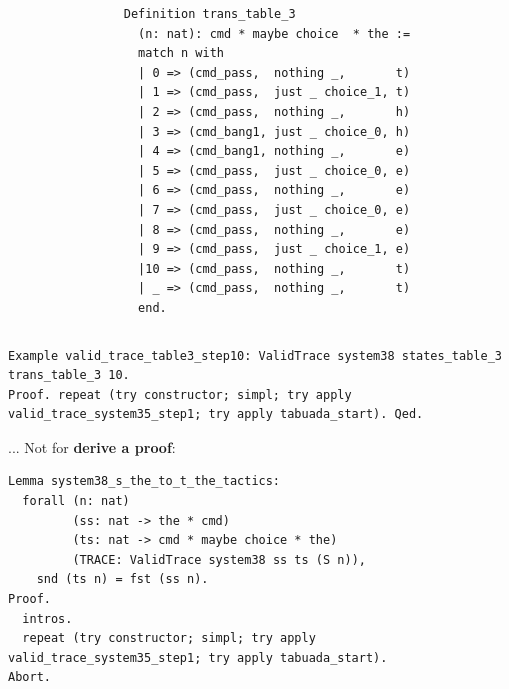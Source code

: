 \documentclass{beamer}
\begin{document}
\begin{frame}[fragile]
\begin{columns}[T]
\begin{column}{.3\textwidth}
\end{column}
\begin{column}{.4\textwidth}
{\fontsize{2.5}{4}\selectfont
\begin{verbatim}
Definition trans_table_3
  (n: nat): cmd * maybe choice  * the :=
  match n with
  | 0 => (cmd_pass,  nothing _,       t)
  | 1 => (cmd_pass,  just _ choice_1, t) 
  | 2 => (cmd_pass,  nothing _,       h) 
  | 3 => (cmd_bang1, just _ choice_0, h) 
  | 4 => (cmd_bang1, nothing _,       e) 
  | 5 => (cmd_pass,  just _ choice_0, e) 
  | 6 => (cmd_pass,  nothing _,       e) 
  | 7 => (cmd_pass,  just _ choice_0, e) 
  | 8 => (cmd_pass,  nothing _,       e) 
  | 9 => (cmd_pass,  just _ choice_1, e) 
  |10 => (cmd_pass,  nothing _,       t) 
  | _ => (cmd_pass,  nothing _,       t)
  end.
\end{verbatim}
}
\end{column}
\end{columns}
{\fontsize{2.5}{4}\selectfont
\begin{verbatim}
Example valid_trace_table3_step10: ValidTrace system38 states_table_3 trans_table_3 10.
Proof. repeat (try constructor; simpl; try apply valid_trace_system35_step1; try apply tabuada_start). Qed.
\end{verbatim}
}
\pause
... Not for \textbf{derive a proof}:
\pause
{\fontsize{2.5}{4}\selectfont

\begin{verbatim}
Lemma system38_s_the_to_t_the_tactics: 
  forall (n: nat)
         (ss: nat -> the * cmd)
         (ts: nat -> cmd * maybe choice * the)
         (TRACE: ValidTrace system38 ss ts (S n)),
    snd (ts n) = fst (ss n).
Proof.
  intros.
  repeat (try constructor; simpl; try apply valid_trace_system35_step1; try apply tabuada_start).
Abort.
\end{verbatim}
}

\end{frame}
\end{document}
